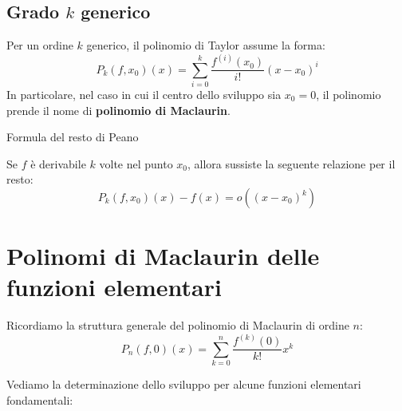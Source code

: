\documentclass[12pt]{report}
\begin{document}
	\subsection{Grado $k$ generico}
	
	Per un ordine $k$ generico, il polinomio di Taylor assume la forma:
	\[
	P_k(f, x_0)(x) = \sum_{i=0}^{k} \frac{f^{(i)}(x_0)}{i!} (x - x_0)^i
	\]
	In particolare, nel caso in cui il centro dello sviluppo sia $x_0 = 0$, il polinomio prende il nome di \textbf{polinomio di Maclaurin}.
	
	\begin{teorema}{Formula del resto di Peano}{}
		
		Se $f$ è derivabile $k$ volte nel punto $x_0$, allora sussiste la seguente relazione per il resto:
		\[
		P_k(f, x_0)(x) - f(x) = o((x - x_0)^k)
		\]
		
	\end{teorema}
	
	\newpage
	\section{Polinomi di Maclaurin delle funzioni elementari}
	
	Ricordiamo la struttura generale del polinomio di Maclaurin di ordine $n$:
	\[
	P_n(f, 0)(x) = \sum_{k=0}^{n} \frac{f^{(k)}(0)}{k!} x^k
	\]
	
	Vediamo la determinazione dello sviluppo per alcune funzioni elementari fondamentali:
	
\end{document}
